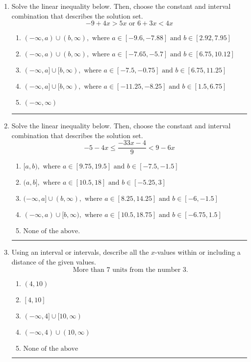 \documentclass[14pt]{extbook}
\newcommand{\litem}[1]{\item#1\hspace*{-1cm}\rule{\textwidth}{0.4pt}}
\begin{document}
\begin{enumerate}
{\begin{enumerate}[label=\Alph*.]
\end{enumerate} }
\litem{
Solve the linear inequality below. Then, choose the constant and interval combination that describes the solution set.\[ -9 + 4 x > 5 x \text{ or } 6 + 3 x < 4 x \]\begin{enumerate}[label=\Alph*.]
\item \( (-\infty, a) \cup (b, \infty), \text{ where } a \in [-9.6, -7.88] \text{ and } b \in [2.92, 7.95] \)
\item \( (-\infty, a) \cup (b, \infty), \text{ where } a \in [-7.65, -5.7] \text{ and } b \in [6.75, 10.12] \)
\item \( (-\infty, a] \cup [b, \infty), \text{ where } a \in [-7.5, -0.75] \text{ and } b \in [6.75, 11.25] \)
\item \( (-\infty, a] \cup [b, \infty), \text{ where } a \in [-11.25, -8.25] \text{ and } b \in [1.5, 6.75] \)
\item \( (-\infty, \infty) \)

\end{enumerate} }
\litem{
Solve the linear inequality below. Then, choose the constant and interval combination that describes the solution set.\[ -5 - 4 x \leq \frac{-33 x - 4}{9} < 9 - 6 x \]\begin{enumerate}[label=\Alph*.]
\item \( [a, b), \text{ where } a \in [9.75, 19.5] \text{ and } b \in [-7.5, -1.5] \)
\item \( (a, b], \text{ where } a \in [10.5, 18] \text{ and } b \in [-5.25, 3] \)
\item \( (-\infty, a] \cup (b, \infty), \text{ where } a \in [8.25, 14.25] \text{ and } b \in [-6, -1.5] \)
\item \( (-\infty, a) \cup [b, \infty), \text{ where } a \in [10.5, 18.75] \text{ and } b \in [-6.75, 1.5] \)
\item \( \text{None of the above.} \)

\end{enumerate} }
\litem{
Using an interval or intervals, describe all the $x$-values within or including a distance of the given values.\[ \text{ More than } 7 \text{ units from the number } 3. \]\begin{enumerate}[label=\Alph*.]
\item \( (4, 10) \)
\item \( [4, 10] \)
\item \( (-\infty, 4] \cup [10, \infty) \)
\item \( (-\infty, 4) \cup (10, \infty) \)
\item \( \text{None of the above} \)


\end{enumerate}}
\end{enumerate}
\end{document}
